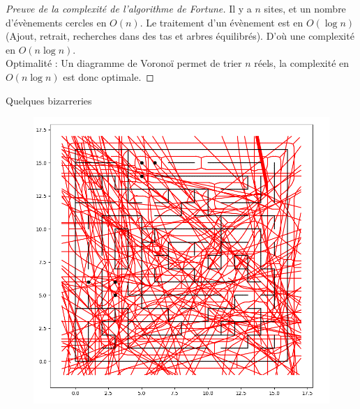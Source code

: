 \begin{frame}
\begin{proof}[Preuve de la complexité de l'algorithme de Fortune]
    Il y a \(n\) sites, et un nombre d'évènements cercles en \(O(n)\). Le traitement d'un évènement est en \(O(\log n)\) (Ajout, retrait, recherches dans des tas et arbres équilibrés). D'où une complexité en \(O(n\log n)\).\\
    \vspace{1em}
    Optimalité : Un diagramme de Voronoï permet de trier \(n\) réels, la complexité en \(O(n\log n)\) est donc optimale.
\end{proof}
\end{frame}


\begin{frame}{Quelques bizarreries}
\begin{figure}
    \centering
    \includegraphics[width=0.6\linewidth]{assets/Bizarre.png}
\end{figure}
\end{frame}

